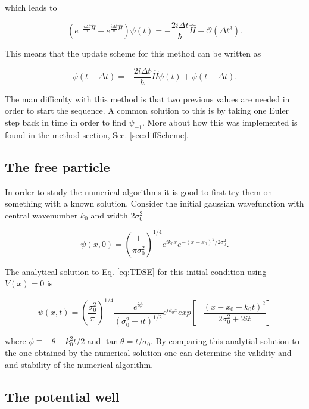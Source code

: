 which leads to

\begin{equation}
   (e^{-\frac{i\Delta t}{\hbar}\hat{H}}-e^{\frac{i\Delta t}{\hbar}\hat{H}})\psi(t) = - \frac{2i\Delta t}{\hbar}\hat H + \mathcal O(\Delta t^3).
\end{equation}

This means that the update scheme for this method can be written as

\begin{equation}
  \label{eq:diffScheme}
  \psi(t+\Delta t) = -\frac{2i\Delta t}{\hbar}\hat H \psi(t) + \psi(t-\Delta t).
\end{equation}

The man difficulty with this method is that two previous values are needed in order to start the sequence. A common solution to this is by taking one Euler step back in time in order to find $\psi_{-1}$. More about how this was implemented is found in the method section, Sec. \ref{sec:diffScheme}.

\subsection{The free particle}

In order to study the numerical algorithms it is good to first try them on something with a known solution. Consider the initial gaussian wavefunction with central wavenumber $k_0$ and width $2\sigma_0^2$

\begin{equation}
  \label{eq:init}
  \psi(x,0) = \left( \frac{1}{\pi \sigma_0^2} \right)^{1/4} e^{ik_0x}e^{-(x-x_0)^2/2\sigma_0^2}.
\end{equation}

The analytical solution to Eq. \eqref{eq:TDSE} for this initial condition using $V(x)=0$ is

\begin{equation}
  \label{eq:free}
  \psi(x,t) = \left(\frac{\sigma_0^2}{\pi}\right)^{1/4} \frac{e^{i\phi}}{(\sigma_0^2 + it)^{1/2}} e^{ik_0x} exp \left[ - \frac{(x-x_0-k_0t)^2}{2\sigma_0^2 + 2it}\right]
\end{equation}

where $\phi \equiv -\theta -k_0^2t/2$ and $\tan \theta = t/\sigma_0$. By comparing this analytial solution to the one obtained by the numerical solution one can determine the validity and and stability of the numerical algorithm.

\subsection{The potential well}

